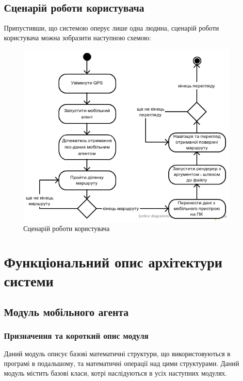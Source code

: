 \documentclass[simple,a4paper,14pt,ukrainian,utf8]{eskdtext}
\begin{document}
	\subsection{Сценарій роботи користувача}
	
		Припустивши, що системою оперує лише одна людина, сценарій роботи користувача можна зобразити наступною схемою:
		
		\begin{figure}
			\centering \includegraphics[scale=0.5]{images/user_activity_1.png}
			\caption{Сценарій роботи користувача}
		\end{figure}
       
\clearpage \newpage 
\section{Функціональний опис архітектури системи}

    \subsection{Модуль мобільного агента}

        \subsubsection{Призначення та короткий опис модуля}

            Даний модуль описує базові математичні структури, що використовуються в програмі в подальшому, та математичні операції над цими структурами. Даний модуль містить базові класи, котрі наслідуються в усіх наступних модулях.
\end{document}
